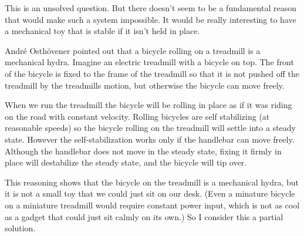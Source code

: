 \solution
This is an unsolved question. But there doesn't seem to be a fundamental reason that would make such a system impossible. It would be really interesting to have a mechanical toy that is stable if it isn't held in place.

Andr\'{e} Osth\"{o}vener pointed out that a bicycle rolling on a treadmill is a mechanical hydra. Imagine an electric treadmill with a bicycle on top. The front of the bicycle is fixed to the frame of the treadmill so that it is not pushed off the treadmill by the treadmills motion, but otherwise the bicycle can move freely. 

When we run the treadmill the bicycle will be rolling in place as if it was riding on the road with constant velocity. Rolling bicycles are self stabilizing (at reasonable speeds) so the bicycle rolling on the treadmill will settle into a steady state. However the self-stabilization works only if the handlebar can move freely. Although the handlebar does not move in the steady state, fixing it firmly in place will destabilize the steady state, and the bicycle will tip over. 

This reasoning shows that the bicycle on the treadmill is a mechanical hydra, but it is not a small toy that we could just sit on our desk. (Even a minature bicycle on a miniature treadmill would require constant power input, which is not as cool as a gadget that could just sit calmly on its own.) So I consider this a partial solution. 

